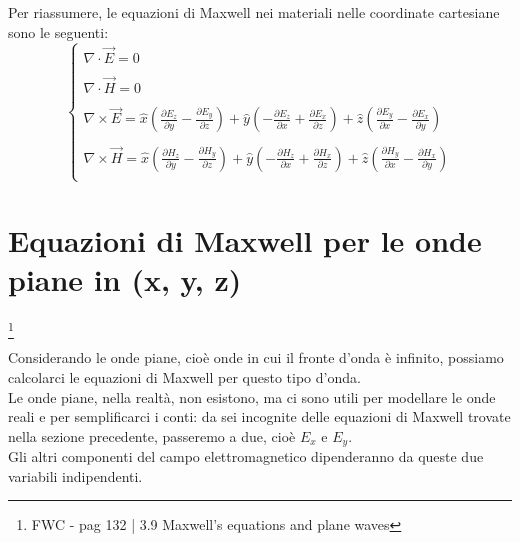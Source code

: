 Per riassumere, le equazioni di Maxwell nei materiali nelle coordinate cartesiane sono le seguenti: \\ 

{ \Large \begin{equation}
    \begin{cases}
        \nabla \cdot \vec{E} = 0 \\ \\ 
        \nabla \cdot \vec{H} = 0 \\ \\
        
        \nabla \times \vec{E} 
        = \hat{x} (\frac{\partial E_z}{\partial y} - \frac{\partial E_y}{\partial z})
        + \hat{y} (-\frac{\partial E_z}{\partial x} + \frac{\partial E_x}{\partial z})
        + \hat{z} (\frac{\partial E_y}{\partial x} - \frac{\partial E_x}{\partial y}) \\ \\ 


        \nabla \times \vec{H}  
 = \hat{x} (\frac{\partial H_z}{\partial y} - \frac{\partial H_y}{\partial z})
 + \hat{y} (-\frac{\partial H_z}{\partial x} + \frac{\partial H_x}{\partial z})
 + \hat{z} (\frac{\partial H_y}{\partial x} - \frac{\partial H_x}{\partial y}) \\ 


 
    \end{cases}
\end{equation}} 

\newpage 

\section{Equazioni di Maxwell per le onde piane in (x, y, z)}
\footnote{FWC - pag 132 | 3.9 Maxwell's equations and plane waves }


Considerando le onde piane, cioè onde in cui il fronte d'onda è infinito, possiamo calcolarci le equazioni di Maxwell per questo 
tipo d'onda. \\ 

Le onde piane, nella realtà, non esistono, ma ci sono utili per modellare le onde reali e per semplificarci i conti:
da sei incognite delle equazioni di Maxwell trovate nella sezione precedente, passeremo a due, cioè $E_x$ e $E_y$. \\ 
Gli altri componenti del campo elettromagnetico dipenderanno da queste due variabili indipendenti. \\ 


